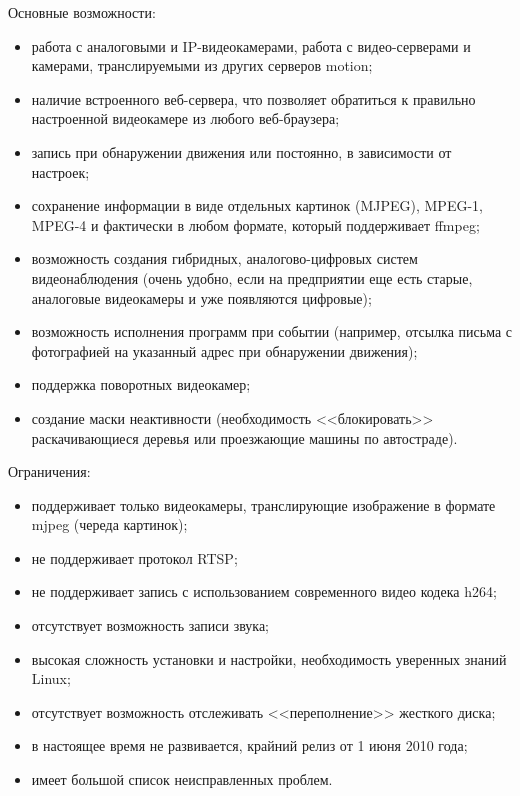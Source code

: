 Основные возможности:
\smallskip
\begin{itemize}
	\item
	работа с аналоговыми и IP-видеокамерами, работа с видео-серверами и камерами,
	транслируемыми из других серверов motion;
	\item
	наличие встроенного веб-сервера, что позволяет обратиться к правильно
	настроенной видеокамере из любого веб-браузера;
	\item
	запись при обнаружении движения или постоянно, в зависимости от настроек;
	\item
	сохранение информации в виде отдельных картинок (MJPEG), MPEG-1, MPEG-4 и
	фактически в любом формате, который поддерживает ffmpeg;
	\item
	возможность создания гибридных, аналогово-цифровых систем видеонаблюдения
	(очень удобно, если на предприятии еще есть старые, аналоговые видеокамеры
	и уже появляются цифровые);
	\item
	возможность исполнения программ при событии
	(например, отсылка письма с фотографией на указанный адрес при обнаружении движения);
	\item
	поддержка поворотных видеокамер;
	\item
	создание маски неактивности (необходимость <<блокировать>> раскачивающиеся
	деревья или проезжающие машины по автостраде).
\end{itemize}

\medskip

Ограничения:
\smallskip
\begin{itemize}
	\item
	поддерживает только видеокамеры, транслирующие изображение в формате mjpeg (череда картинок);
	\item не поддерживает протокол RTSP;
	\item не поддерживает запись с использованием современного видео кодека h264;
	\item отсутствует возможность записи звука;
	\item высокая сложность установки и настройки, необходимость уверенных знаний Linux;
	\item отсутствует возможность отслеживать <<переполнение>> жесткого диска;
	\item в настоящее время не развивается, крайний релиз от 1 июня 2010 года;
	\item имеет большой список неисправленных проблем.
\end{itemize}

\medskip

